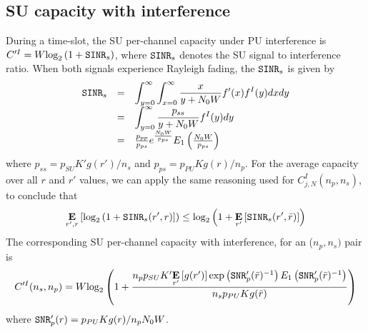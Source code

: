 \subsection{SU capacity with interference}
During a time-slot, the SU per-channel capacity under PU interference is $C'^{I} = W\text{log}_{2}\left(1+\text{\ttfamily{SINR}}_{s}\right)$, where $\text{\ttfamily{SINR}}_{s}$ denotes the SU signal to interference ratio. 
When both signals experience Rayleigh fading, the $\text{\ttfamily{SINR}}_{s}$ is given by
\begin{equation}\label{SINRs}
\begin{array}{lcl}
\text{\ttfamily{SINR}}_{s} & = & \displaystyle\int_{y=0}^{\infty}\displaystyle\int_{x=0}^{\infty}
\displaystyle\frac{x}{y+N_{0}W}f'(x)f^{I}(y)dxdy \\
& = & \displaystyle\int_{y=0}^{\infty}\displaystyle\frac{p_{ss}}{y + N_{0}W}f^{I}(y)dy \\
& = & \frac{p_{pp}}{p_{ps}}e^{\frac{N_{0}W}{p_{ps}}}E_{1}\left(\frac{N_{0}W}{p_{ps}}\right)
\end{array}
\end{equation}
where $p_{ss}= p_{SU}K'g(r')/n_{s}$ and $p_{ps}=p_{PU}Kg(r)/n_{p}$. For the average capacity over all $r$ and $r'$ values, we can apply the same reasoning used for $C^{I}_{j,N}(n_{p},n_{s})$, to conclude that
\begin{equation}
\underset{r',r}{\mathbf{E}}\left[\text{log}_{2}\left(1+\text{\ttfamily{SINR}}_{s}(r',r)\right]\right) \leq \\
\text{log}_{2}\left(1+\underset{r'}{\mathbf{E}}\left[\text{\ttfamily{SINR}}_{s}(r',\bar{r})\right]\right)
\end{equation}
The corresponding SU per-channel capacity with interference, for an ($n_{p},n_{s})$ pair is
\begin{equation}\label{CISU}
C'^{I}(n_{s},n_{p}) = \\
W\text{log}_{2}\left(1+
\frac{n_{p}p_{SU}K'\underset{r'}{\mathbf{E}}\left[g(r')\right]\text{exp}\left(\text{\ttfamily{SNR}}'_{p}(\bar{r})^{-1}\right)E_{1}\left(\text{\ttfamily{SNR}}'_{p}(\bar{r})^{-1}\right)}
{n_{s}p_{PU}Kg(\bar{r})}\right)
\end{equation}
where $\text{\ttfamily{SNR}}'_{p}(r)=p_{PU}Kg(r)/n_{p}N_{0}W$.
